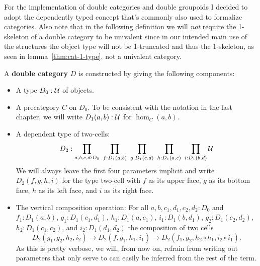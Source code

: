 For the implementation of double categories and double groupoids I decided to
adopt the dependently typed concept that's commonly also used to formalize categories.
Also note that in the following definition we will \emph{not} require the
1-skeleton of a double category to be univalent since in our intended main
use of the structures the object type will not be 1-truncated and thus the
1-skeleton, as seen in lemma~\ref{thm:cat-1-type}, not a univalent category.

\begin{defn}
A \textbf{double category} $D$ is constructed by giving the following components:
\begin{itemize}
\item A type $D_0 : \mathcal{U}$ of objects.
\item A precategory $C$ on $D_0$. To be consistent with the notation in the last
chapter, we will write $D_1(a, b) : \mathcal{U}$ for $\hom_C(a, b)$.
\item A dependent type of two-cells:
\begin{equation*}
D_2 : \prod_{a,b,c,d:D_0} ~ \prod_{f:D_1(a,b)} ~ \prod_{g:D_1(c,d)}
	~ \prod_{h:D_1(a,c)} ~ \prod_{i:D_1(b,d)} \mathcal{U}
\end{equation*}
We will always leave the first four parameters implicit and write $D_2(f,g,h,i)$
for the type two-cell with $f$ as its upper face, $g$ as its bottom face,
$h$ as its left face, and $i$ as its right face.
\item The vertical composition operation: For all $a, b, c_1, d_1, c_2, d_2 : D_0$
and $f_1 : D_1(a, b)$, $g_1 : D_1(c_1, d_1)$, $h_1 : D_1(a, c_1)$, $i_1 : D_1(b, d_1)$,
$g_2 : D_1(c_2, d_2)$, $h_2 : D_1(c_1, c_2)$, and $i_2 : D_1(d_1, d_2)$ the composition
of two cells
\begin{equation*}
D_2(g_1, g_2, h_2, i_2) \to D_2(f, g_1, h_1, i_1) 
	\to D_2(f_1, g_2, h_2 \circ h_1, i_2 \circ i_1) \text{.}
\end{equation*}
As this is pretty verbose, we will, from now on, refrain from writing out parameters
that only serve to can easily be inferred from the rest of the term. %


\end{itemize}
\end{defn}
